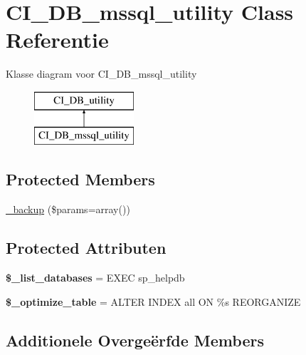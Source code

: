 \hypertarget{class_c_i___d_b__mssql__utility}{}\section{C\+I\+\_\+\+D\+B\+\_\+mssql\+\_\+utility Class Referentie}
\label{class_c_i___d_b__mssql__utility}
Klasse diagram voor C\+I\+\_\+\+D\+B\+\_\+mssql\+\_\+utility\begin{figure}[H]
\begin{center}
\leavevmode
\includegraphics[height=2.000000cm]{class_c_i___d_b__mssql__utility}
\end{center}
\end{figure}
\subsection*{Protected Members}
\begin{DoxyCompactItemize}
\item 
\mbox{\hyperlink{class_c_i___d_b__mssql__utility_a30f3053d2c82e7562349924363507afa}{\+\_\+backup}} (\$params=array())
\end{DoxyCompactItemize}
\subsection*{Protected Attributen}
\begin{DoxyCompactItemize}
\item 
\mbox{\label{class_c_i___d_b__mssql__utility_afe3a5b80562d93d6bc7e2b53c95b7e5a}} 
{\bfseries \$\+\_\+list\+\_\+databases} = \textquotesingle{}E\+X\+EC sp\+\_\+helpdb\textquotesingle{}
\item 
\mbox{\label{class_c_i___d_b__mssql__utility_a083199e5c22c78912dae0a47bb2d7fad}} 
{\bfseries \$\+\_\+optimize\+\_\+table} = \textquotesingle{}A\+L\+T\+ER I\+N\+D\+EX all ON \%s R\+E\+O\+R\+G\+A\+N\+I\+ZE\textquotesingle{}
\end{DoxyCompactItemize}
\subsection*{Additionele Overge\"{e}rfde Members}


